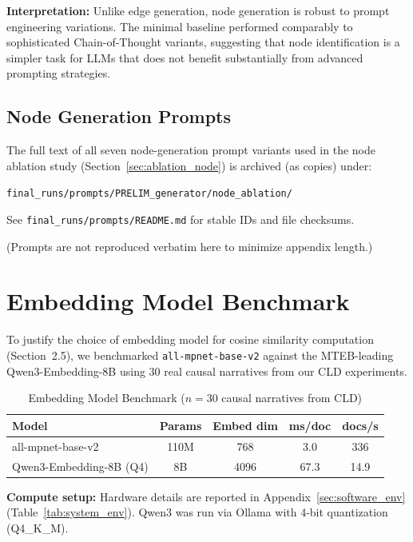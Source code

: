 \textbf{Interpretation:} Unlike edge generation, node generation is robust to prompt engineering variations. The minimal baseline performed comparably to sophisticated Chain-of-Thought variants, suggesting that node identification is a simpler task for LLMs that does not benefit substantially from advanced prompting strategies.

\section{Node Generation Prompts}
\label{sec:node_prompts}

The full text of all seven node-generation prompt variants used in the node ablation study (Section~\ref{sec:ablation_node}) is archived (as copies) under:

\noindent\texttt{final\_runs/prompts/PRELIM\_generator/node\_ablation/}

\noindent See \texttt{final\_runs/prompts/README.md} for stable IDs and file checksums.

\noindent (Prompts are not reproduced verbatim here to minimize appendix length.)

\chapter{Embedding Model Benchmark}
\label{sec:embedding_benchmark}

To justify the choice of embedding model for cosine similarity computation (Section~2.5), we benchmarked \texttt{all-mpnet-base-v2} against the MTEB-leading Qwen3-Embedding-8B using 30 real causal narratives from our CLD experiments.

\begin{table}[H]
\centering
\caption{Embedding Model Benchmark ($n=30$ causal narratives from CLD)}
\label{tab:embed_benchmark}
\footnotesize
\begin{tabular}{@{}lcccc@{}}
\toprule
\textbf{Model} & \textbf{Params} & \textbf{Embed dim} & \textbf{ms/doc} & \textbf{docs/s} \\
\midrule
all-mpnet-base-v2 & 110M & 768 & 3.0 & 336 \\
Qwen3-Embedding-8B (Q4) & 8B & 4096 & 67.3 & 14.9 \\
\bottomrule
\end{tabular}
\end{table}

\textbf{Compute setup:} Hardware details are reported in Appendix~\ref{sec:software_env} (Table~\ref{tab:system_env}). Qwen3 was run via Ollama with 4-bit quantization (Q4\_K\_M).

